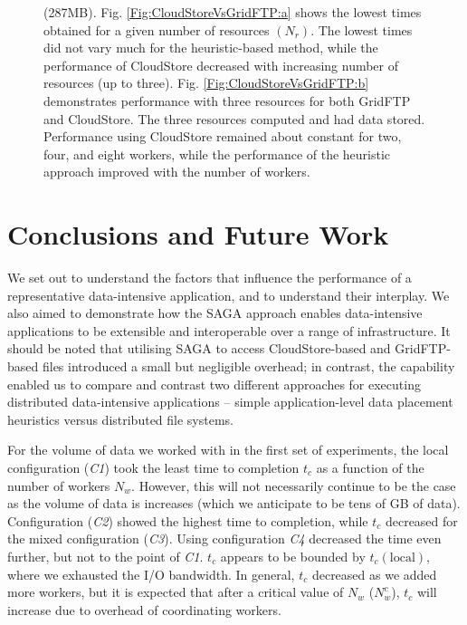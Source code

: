 \documentclass{rspublic}
\begin{document}
\begin{figure}
\begin{center}
{\label{Fig:CloudStoreVsGridFTP:b}
}
\caption{(287MB). Fig. \ref{Fig:CloudStoreVsGridFTP:a}
 shows the lowest times obtained for a given number of resources
 $(N_{r})$. The lowest times did not vary much for the heuristic-based 
 method, while the performance of CloudStore decreased with increasing number of
 resources (up to three). Fig. \ref{Fig:CloudStoreVsGridFTP:b}
 demonstrates performance with three resources for both GridFTP and
 CloudStore. The three resources computed and had data stored.
 Performance using CloudStore remained about constant for two, four, and
 eight workers, while the performance of the heuristic approach improved
 with the number of workers.}
\label{Fig:CloudStoreVsGridFTP}
\end{center}
\vspace{-0.4cm}
\end{figure}

%
\vspace{-0.5cm}

\section{Conclusions and Future Work}


We set out to understand the factors that influence the performance of
a representative data-intensive application, and to understand their
interplay. We also aimed to demonstrate how the SAGA approach enables
data-intensive applications to be extensible and interoperable over a
range of infrastructure. It should be noted that utilising SAGA to
access CloudStore-based and GridFTP-based files introduced a small but
negligible overhead; in contrast, the capability enabled us to compare
and contrast two different approaches for executing distributed
data-intensive applications -- simple application-level data placement
heuristics versus distributed file systems.

For the volume of data we worked with in the first set of experiments,
the local configuration (\textit{C1}) took the least time to
completion $t_c$ as a function of the number of workers
$N_w$. However, this will not necessarily continue to be the case as
the volume of data is increases (which we anticipate to be
tens of GB of data). Configuration (\textit{C2}) showed the
highest time to completion, while $t_c$ decreased for the mixed
configuration (\textit{C3}). Using configuration \textit{C4} decreased
the time even further, but not to the point of \textit{C1}. $t_c$
appears to be bounded by $t_c(\mbox{local})$, where we exhausted the
I/O bandwidth. In general, $t_c$ decreased as we added more workers,
but it is expected that after a critical value of $N_w$ ($N^c_w$),
$t_c$ will increase due to overhead of coordinating workers.
\end{document}

